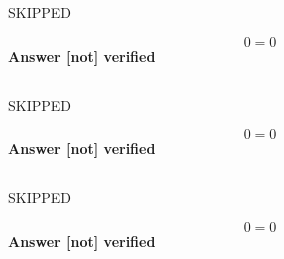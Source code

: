 SKIPPED

\begin{equation}
	0=0
\label{answer2.17}
\end{equation}
\textbf{Answer [not] verified}

\subsection{}

SKIPPED

\begin{equation}
	0=0
\label{answer2.18}
\end{equation}
\textbf{Answer [not] verified}

\subsection{}

SKIPPED

\begin{equation}
	0=0
\label{answer2.19}
\end{equation}
\textbf{Answer [not] verified}






%
%
%	





